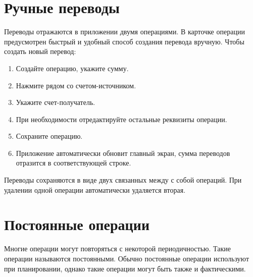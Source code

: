 \documentclass[a4paper,10pt,russian]{sphinxmanual}
\begin{document}
\section{Ручные переводы}
\label{\detokenize{transactions:id5}}
Переводы отражаются в приложении двумя операциями. В карточке операции предусмотрен быстрый и удобный способ
создания перевода вручную. Чтобы создать новый перевод:
\begin{enumerate}
\def\theenumi{\arabic{enumi}}
\def\labelenumi{\theenumi .}
\makeatletter\def\p@enumii{\p@enumi \theenumi .}\makeatother
\item {} 
Создайте операцию, укажите сумму.

\item {} 
Нажмите  рядом со счетом-источником.

\item {} 
Укажите счет-получатель.

\item {} 
При необходимости отредактируйте остальные реквизиты операции.

\item {} 
Сохраните операцию.

\item {} 
Приложение автоматически обновит главный экран, сумма переводов отразится в соответствующей строке.

\end{enumerate}

\noindent{}
\noindent{}
\noindent{}
\noindent{}
\noindent{}
\noindent{}
\noindent{}

Переводы сохраняются в виде двух связанных между с собой операций. При удалении одной
операции автоматически удаляется вторая.


\section{Постоянные операции}
\label{\detokenize{transactions:id6}}
Многие операции могут повторяться с некоторой периодичностью. Такие операции называются постоянными. Обычно постоянные
операции используют при планировании, однако такие операции могут быть также и фактическими.
\end{document}
